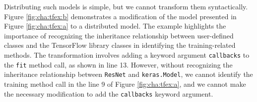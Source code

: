 
Distributing such models is simple, but we cannot transform them syntactically.
Figure \ref{fig:cha:tfex:b} demonstrates a modification of the model presented
in Figure \ref{fig:cha:tfex:a} to a distributed model. 
The example highlights the importance of recognizing the inheritance
relationship between user-defined classes and the TensorFlow library classes in
identifying the training-related methods. 
The transformation involves adding a keyword argument {\tt callbacks} to the
{\tt fit} method call, as shown in line 13.
However, without recognizing the inheritance relationship between {\tt ResNet}
and {\tt keras.Model}, we cannot identify the training method call in the line
9 of Figure \ref{fig:cha:tfex:a}, and we cannot make the necessary modification
to add the {\tt callbacks} keyword argument.


